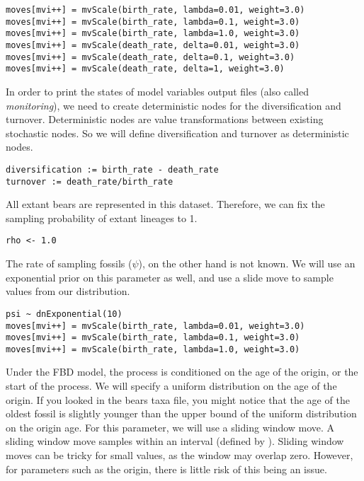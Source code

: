 {\tt \begin{snugshade*}
\begin{lstlisting}
moves[mvi++] = mvScale(birth_rate, lambda=0.01, weight=3.0)
moves[mvi++] = mvScale(birth_rate, lambda=0.1, weight=3.0)
moves[mvi++] = mvScale(birth_rate, lambda=1.0, weight=3.0)
moves[mvi++] = mvScale(death_rate, delta=0.01, weight=3.0)
moves[mvi++] = mvScale(death_rate, delta=0.1, weight=3.0)
moves[mvi++] = mvScale(death_rate, delta=1, weight=3.0)
\end{lstlisting}
\end{snugshade*}}

In order to print the states of model variables output files (also called \textit{monitoring}), we need to create deterministic nodes for the diversification and turnover. 
Deterministic nodes are value transformations between existing stochastic nodes. 
So we will define diversification and turnover as deterministic nodes.

{\tt \begin{snugshade*}
\begin{lstlisting}
diversification := birth_rate - death_rate
turnover := death_rate/birth_rate
\end{lstlisting}
\end{snugshade*}}

All extant bears are represented in this dataset. 
Therefore, we can fix the sampling probability of extant lineages to 1.

{\tt \begin{snugshade*}
\begin{lstlisting}
rho <- 1.0
\end{lstlisting}
\end{snugshade*}}

The rate of sampling fossils ($\psi$), on the other hand is not known. 
We will use an exponential prior on this parameter as well, and use a slide move to sample values from our distribution.

{\tt \begin{snugshade*}
\begin{lstlisting}
psi ~ dnExponential(10) 
moves[mvi++] = mvScale(birth_rate, lambda=0.01, weight=3.0)
moves[mvi++] = mvScale(birth_rate, lambda=0.1, weight=3.0)
moves[mvi++] = mvScale(birth_rate, lambda=1.0, weight=3.0)
\end{lstlisting}
\end{snugshade*}}

Under the FBD model, the process is conditioned on the age of the origin, or the start of the process. 
We will specify a uniform distribution on the age of the origin. If you looked in the bears taxa file, you might notice that the age of the oldest fossil is slightly younger than the upper bound of the uniform distribution on the origin age. 
For this parameter, we will use a sliding window move. A sliding window move samples within an interval (defined by ). 
Sliding window moves can be tricky for small values, as the window may overlap zero. 
However, for parameters such as the origin, there is little risk of this being an issue.

